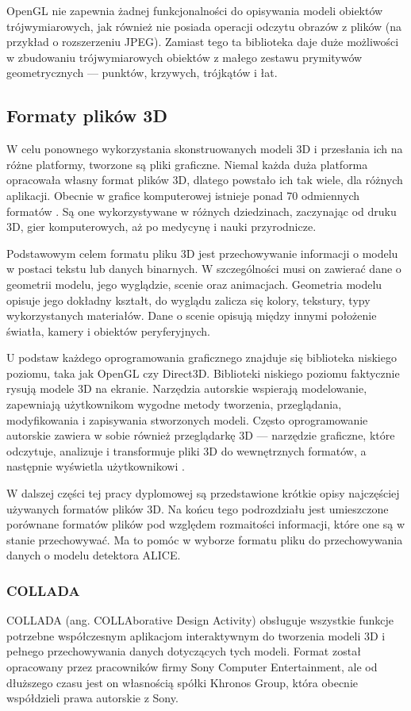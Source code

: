 OpenGL nie zapewnia żadnej funkcjonalności do opisywania modeli obiektów trójwymiarowych, jak również nie posiada operacji odczytu obrazów z plików (na przykład o rozszerzeniu JPEG). Zamiast tego ta biblioteka daje duże możliwości w zbudowaniu trójwymiarowych obiektów z małego zestawu prymitywów geometrycznych --- punktów, krzywych, trójkątów i łat.

\subsection{Formaty plików 3D}
W celu ponownego wykorzystania skonstruowanych modeli 3D i przesłania ich na różne platformy, tworzone są pliki graficzne. Niemal każda duża platforma opracowała własny format plików 3D, dlatego powstało ich tak wiele, dla różnych aplikacji. Obecnie w grafice komputerowej istnieje ponad 70 odmiennych formatów \cite{formatslist}. Są one wykorzystywane w różnych dziedzinach, zaczynając od druku 3D, gier komputerowych, aż po medycynę i nauki przyrodnicze.

Podstawowym celem formatu pliku 3D jest przechowywanie informacji o modelu w postaci tekstu lub danych binarnych. W szczególności musi on zawierać dane o geometrii modelu, jego wyglądzie, scenie oraz animacjach. Geometria modelu opisuje jego dokładny kształt, do wyglądu zalicza się kolory, tekstury, typy wykorzystanych materiałów. Dane o scenie opisują między innymi położenie światła, kamery i obiektów peryferyjnych.

U podstaw każdego oprogramowania graficznego znajduje się biblioteka niskiego poziomu, taka jak OpenGL czy Direct3D. Biblioteki niskiego poziomu faktycznie rysują modele 3D na ekranie. Narzędzia autorskie wspierają modelowanie, zapewniają użytkownikom wygodne metody tworzenia, przeglądania, modyfikowania i zapisywania stworzonych modeli. Często oprogramowanie autorskie zawiera w sobie również przeglądarkę 3D --- narzędzie graficzne, które odczytuje, analizuje i transformuje pliki 3D do wewnętrznych formatów, a następnie wyświetla użytkownikowi \cite{formatsinfo}.

W dalszej części tej pracy dyplomowej są przedstawione krótkie opisy najczęściej używanych formatów plików 3D. Na końcu tego podrozdziału jest umieszczone porównane formatów plików pod względem rozmaitości informacji, które one są w stanie przechowywać. Ma to pomóc w wyborze formatu pliku do przechowywania danych o modelu detektora ALICE.

\subsubsection{COLLADA}
COLLADA (ang. COLLAborative Design Activity) obsługuje wszystkie funkcje potrzebne współczesnym aplikacjom interaktywnym do tworzenia modeli 3D i pełnego przechowywania danych dotyczących tych modeli. Format został opracowany przez pracowników firmy Sony Computer Entertainment, ale od dłuższego czasu jest on własnością spółki Khronos Group, która obecnie współdzieli prawa autorskie z Sony. 


